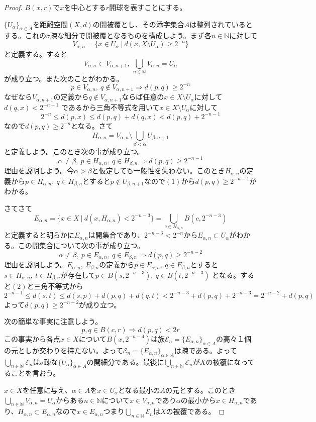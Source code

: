 \documentclass[leqno]{jsarticle}
\newcommand{\To}{\Longrightarrow}
\newcommand{\nn}{\mathbb{N}}
\newcommand{\dpst}{\displaystyle}
\newcommand{\al}{\alpha}
\newcommand{\be}{\beta}
\begin{document}
\begin{proof}$B(x,r)$で$x$を中心とする$r$開球を表すことにする。\par
$\{U_{\alpha}\}_{\alpha \in A}$を距離空間$(X,d)$の開被覆とし、その添字集合$A$は整列されているとする。これの$\sigma$疎な細分で開被覆となるものを構成しよう。まず各$n\in \nn$に対して
\[
V_{\al,n}=\{x\in U_{\al}\ |\ d(x,X\setminus U_{\al})\ge 2^{-n}\}
\]
と定義する。すると
\[
V_{\al,n}\subset V_{\al,n+1},\ \bigcup_{n\in \nn}V_{\al,n}=U_{\al}
\]
が成り立つ。また次のことがわかる。
\begin{equation}
p\in V_{\al,n},\ q\not\in V_{\al,n+1}\To d(p,q)\ge2^{-n}
\end{equation}
なぜなら$V_{\al,n+1}$の定義から$q\not\in V_{\al,n+1}$ならば任意の$x\in X\setminus U_{\al}$に対して$d(q,x)<2^{-n-1}$
であるから三角不等式を用いて$x\in X\setminus U_{\al}$に対して
\[
2^{-n}\le d(p,x)\le d(p,q)+d(q,x)< d(p,q)+2^{-n-1}
\]
なので$d(p,q)\ge2^{-n}$となる。さて
\[
H_{\al,n}=V_{\al,n}\setminus\bigcup_{\be<\al}U_{\be,n+1}
\]
と定義しよう。このとき次の事が成り立つ。
\begin{equation}
\al\neq\be,\ p\in H_{\al,n},\ q\in H_{\be,n}\To d(p,q)\ge 2^{-n-1} 
\end{equation}
理由を説明しよう。今$\al>\be$と仮定しても一般性を失わない。このとき$H_{\al,n}$の定義から$p\in H_{\al,n},\ q\in H_{\be,n}$とすると$p\not\in U_{\be,n+1}$なので$(1)$から$d(p,q)\ge2^{-n-1}$がわかる。\par
さてさて
\[
E_{\al,n}=\{x\in X\ |\ d(x,H_{\al,n})<2^{-n-3}\}=\bigcup_{c\in H_{\al,n}}B(c,2^{-n-3})
\]
と定義すると明らかに$E_{\al,n}$は開集合であり、$2^{-n-3}<2^{-n}$から$E_{\al,n}\subset U_{\al}$がわかる。この開集合について次の事が成り立つ。
\begin{equation}
\al\neq\be,\ p\in E_{\al,n},\ q\in E_{\be,n}\To d(p,q)\ge 2^{-n-2} 
\end{equation}
理由を説明しよう。$E_{\al,n},\ E_{\be,n}$の定義から$p\in E_{\al,n},\ q\in E_{\be,n}$とすると
$s\in H_{\al,n},\ t\in H_{\be,n}$が存在して$p\in B(s,2^{-n-3}),\ q\in B(t,2^{-n-3})$
となる。すると$(2)$と三角不等式から
\[
2^{-n-1}\le d(s,t)\le d(s,p)+d(p,q)+d(q,t)<2^{-n-3}+d(p,q)+2^{-n-3}=2^{-n-2}+d(p,q)
\]
よって$d(p,q)\ge 2^{-n-2} $が成り立つ。\par
次の簡単な事実に注意しよう。
\[
p,q\in B(c,r)\To d(p,q)<2r
\]
この事実から各点$x\in X$について$B(x,2^{-n-4})$は族$\mathcal{E}_n=\{E_{\al,n}\}_{\al\in A}$の高々１個の元としか交わりを持たない。よって$\mathcal{E}_n=\{E_{\al,n}\}_{\al\in A}$は疎である。よって$\dpst \bigcup_{n\in \nn}\mathcal{E}_n$は$\sigma$疎な$\{U_{\al}\}_{\al\in A}$の開細分である。最後に$\dpst \bigcup_{n\in \nn}\mathcal{E}_n$が$X$の被覆になってることを言おう。\par 
$x\in X$を任意に与え、$\al\in A$を$x\in U_{\al}$となる最小の$A$の元とする。このとき
$\dpst \bigcup_{n\in \nn}V_{\al,n}=U_{\al}$からある$n\in\nn$について$x\in V_{\al,n}$であり$\al$の最小から$x\in H_{\al,n}$であり、$H_{\al,n}\subset E_{\al,n}$なので$x\in E_{\al,n}$つまり$\dpst \bigcup_{n\in \nn}\mathcal{E}_n$は$X$の被覆である。
\end{proof}
\end{document}
